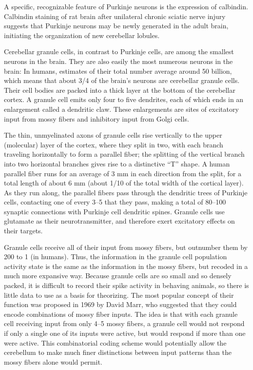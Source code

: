 \documentclass[]{book}
\begin{document}
A specific, recognizable feature of Purkinje neurons is the expression of calbindin. Calbindin staining of rat brain after unilateral chronic sciatic nerve injury suggests that Purkinje neurons may be newly generated in the adult brain, initiating the organization of new cerebellar lobules.

Cerebellar granule cells, in contrast to Purkinje cells, are among the smallest neurons in the brain. They are also easily the most numerous neurons in the brain: In humans, estimates of their total number average around 50 billion, which means that about 3/4 of the brain's neurons are cerebellar granule cells. Their cell bodies are packed into a thick layer at the bottom of the cerebellar cortex. A granule cell emits only four to five dendrites, each of which ends in an enlargement called a dendritic claw. These enlargements are sites of excitatory input from mossy fibers and inhibitory input from Golgi cells.

The thin, unmyelinated axons of granule cells rise vertically to the upper (molecular) layer of the cortex, where they split in two, with each branch traveling horizontally to form a parallel fiber; the splitting of the vertical branch into two horizontal branches gives rise to a distinctive ``T'' shape. A human parallel fiber runs for an average of 3 mm in each direction from the split, for a total length of about 6 mm (about 1/10 of the total width of the cortical layer). As they run along, the parallel fibers pass through the dendritic trees of Purkinje cells, contacting one of every 3--5 that they pass, making a total of 80--100 synaptic connections with Purkinje cell dendritic spines. Granule cells use glutamate as their neurotransmitter, and therefore exert excitatory effects on their targets.

Granule cells receive all of their input from mossy fibers, but outnumber them by 200 to 1 (in humans). Thus, the information in the granule cell population activity state is the same as the information in the mossy fibers, but recoded in a much more expansive way. Because granule cells are so small and so densely packed, it is difficult to record their spike activity in behaving animals, so there is little data to use as a basis for theorizing. The most popular concept of their function was proposed in 1969 by David Marr, who suggested that they could encode combinations of mossy fiber inputs. The idea is that with each granule cell receiving input from only 4--5 mossy fibers, a granule cell would not respond if only a single one of its inputs were active, but would respond if more than one were active. This combinatorial coding scheme would potentially allow the cerebellum to make much finer distinctions between input patterns than the mossy fibers alone would permit.
\end{document}
